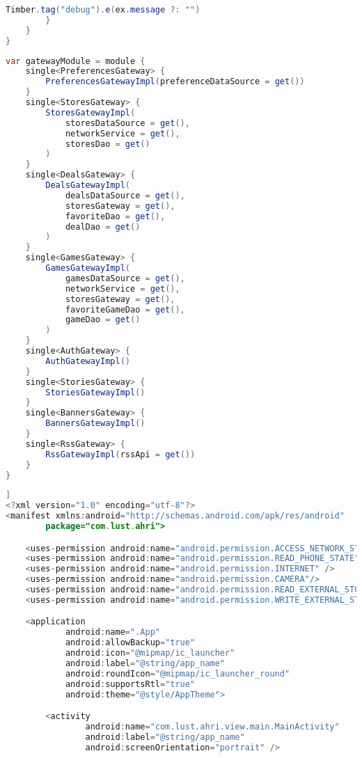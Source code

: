 \begin{asection}
\begin{lstlisting}[language=Java,label={lst:add:a_3}, caption={BaseViewModel}]
            Timber.tag("debug").e(ex.message ?: "")
        }
    }
}
\end{lstlisting}
\hfill \break
\begin{lstlisting}[language=Java,label={lst:add:a_4}, caption={Koin}]
var gatewayModule = module {
    single<PreferencesGateway> {
        PreferencesGatewayImpl(preferenceDataSource = get())
    }
    single<StoresGateway> {
        StoresGatewayImpl(
            storesDataSource = get(),
            networkService = get(),
            storesDao = get()
        )
    }
    single<DealsGateway> {
        DealsGatewayImpl(
            dealsDataSource = get(),
            storesGateway = get(),
            favoriteDao = get(),
            dealDao = get()
        )
    }
    single<GamesGateway> {
        GamesGatewayImpl(
            gamesDataSource = get(),
            networkService = get(),
            storesGateway = get(),
            favoriteGameDao = get(),
            gameDao = get()
        )
    }
    single<AuthGateway> {
        AuthGatewayImpl()
    }
    single<StoriesGateway> {
        StoriesGatewayImpl()
    }
    single<BannersGateway> {
        BannersGatewayImpl()
    }
    single<RssGateway> {
        RssGatewayImpl(rssApi = get())
    }
}
\end{lstlisting}
\hfill \break
\begin{lstlisting}[language=Java,label={lst:add:a_5}, caption={AndroidManifest.xml}]]
<?xml version="1.0" encoding="utf-8"?>
<manifest xmlns:android="http://schemas.android.com/apk/res/android"
        package="com.lust.ahri">

    <uses-permission android:name="android.permission.ACCESS_NETWORK_STATE" />
    <uses-permission android:name="android.permission.READ_PHONE_STATE" />
    <uses-permission android:name="android.permission.INTERNET" />
    <uses-permission android:name="android.permission.CAMERA"/>
    <uses-permission android:name="android.permission.READ_EXTERNAL_STORAGE" />
    <uses-permission android:name="android.permission.WRITE_EXTERNAL_STORAGE" />

    <application
            android:name=".App"
            android:allowBackup="true"
            android:icon="@mipmap/ic_launcher"
            android:label="@string/app_name"
            android:roundIcon="@mipmap/ic_launcher_round"
            android:supportsRtl="true"
            android:theme="@style/AppTheme">

        <activity
                android:name="com.lust.ahri.view.main.MainActivity"
                android:label="@string/app_name"
                android:screenOrientation="portrait" />


\end{lstlisting}
\end{asection}
